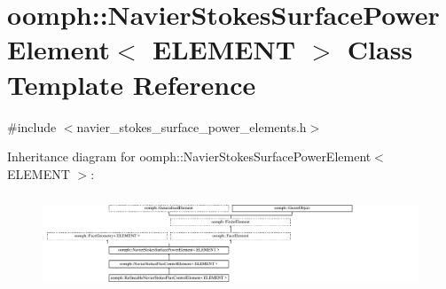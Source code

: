 \hypertarget{classoomph_1_1NavierStokesSurfacePowerElement}{}\section{oomph\+:\+:Navier\+Stokes\+Surface\+Power\+Element$<$ E\+L\+E\+M\+E\+NT $>$ Class Template Reference}
\label{classoomph_1_1NavierStokesSurfacePowerElement}


{\ttfamily \#include $<$navier\+\_\+stokes\+\_\+surface\+\_\+power\+\_\+elements.\+h$>$}

Inheritance diagram for oomph\+:\+:Navier\+Stokes\+Surface\+Power\+Element$<$ E\+L\+E\+M\+E\+NT $>$\+:\begin{figure}[H]
\begin{center}
\leavevmode
\includegraphics[height=2.879177cm]{classoomph_1_1NavierStokesSurfacePowerElement}
\end{center}
\end{figure}
